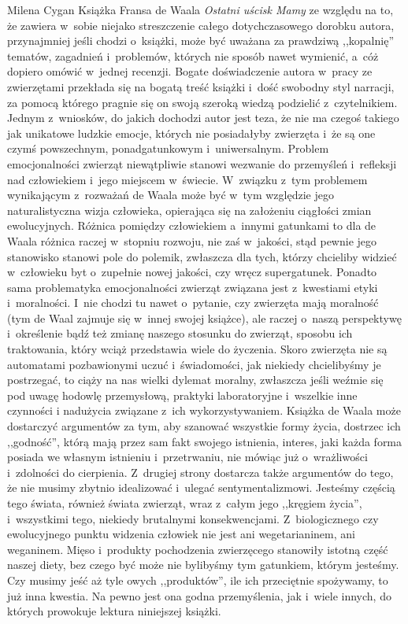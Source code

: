 \begin{newrevplenv}{Milena Cygan}
Książka Fransa de Waala \textit{Ostatni uścisk Mamy} ze względu na to, że zawiera w~sobie niejako streszczenie całego dotychczasowego dorobku autora, przynajmniej jeśli chodzi o~książki, może być uważana za prawdziwą ,,kopalnię'' tematów, zagadnień i~problemów, których nie sposób nawet wymienić, a~cóż dopiero omówić w~jednej recenzji. Bogate doświadczenie autora w~pracy ze zwierzętami przekłada się na bogatą treść książki i~dość swobodny styl narracji, za pomocą którego pragnie się on swoją szeroką wiedzą podzielić z~czytelnikiem. Jednym z~wniosków, do jakich dochodzi autor jest teza, że nie ma czegoś takiego jak unikatowe ludzkie emocje, których nie posiadałyby zwierzęta i~że są one czymś powszechnym, ponadgatunkowym i~uniwersalnym. Problem emocjonalności zwierząt niewątpliwie stanowi wezwanie do przemyśleń i~refleksji nad człowiekiem i~jego miejscem w~świecie. W~związku z~tym problemem wynikającym z~rozważań de Waala może być w~tym względzie jego naturalistyczna wizja człowieka, opierająca się na założeniu ciągłości zmian ewolucyjnych. Różnica pomiędzy człowiekiem a~innymi gatunkami to dla de Waala różnica raczej w~stopniu rozwoju, nie zaś w~jakości, stąd pewnie jego stanowisko stanowi pole do polemik, zwłaszcza dla tych, którzy chcieliby widzieć w~człowieku byt o~zupełnie nowej jakości, czy wręcz supergatunek. Ponadto sama problematyka emocjonalności zwierząt związana jest z~kwestiami etyki i~moralności. I~nie chodzi tu nawet o~pytanie, czy zwierzęta mają moralność (tym de Waal zajmuje się w~innej swojej książce), ale raczej o~naszą perspektywę i~określenie bądź też zmianę naszego stosunku do zwierząt, sposobu ich traktowania, który wciąż przedstawia wiele do życzenia. Skoro zwierzęta nie są automatami pozbawionymi uczuć i~świadomości, jak niekiedy chcielibyśmy je postrzegać, to ciąży na nas wielki dylemat moralny, zwłaszcza jeśli weźmie się pod uwagę hodowlę przemysłową, praktyki laboratoryjne i~wszelkie inne czynności i nadużycia związane z~ich wykorzystywaniem. Książka de Waala może dostarczyć argumentów za tym, aby szanować wszystkie formy życia, dostrzec ich ,,godność'', którą mają przez sam fakt swojego istnienia, interes, jaki każda forma posiada we własnym istnieniu i~przetrwaniu, nie mówiąc już o~wrażliwości i~zdolności do cierpienia. Z~drugiej strony dostarcza także argumentów do tego, że nie musimy zbytnio idealizować i~ulegać sentymentalizmowi. Jesteśmy częścią tego świata, również świata zwierząt, wraz z~całym jego ,,kręgiem życia'', i~wszystkimi tego, niekiedy brutalnymi konsekwencjami. Z~biologicznego czy ewolucyjnego punktu widzenia człowiek nie jest ani wegetarianinem, ani weganinem. Mięso i~produkty pochodzenia zwierzęcego stanowiły istotną część naszej diety, bez czego być może nie bylibyśmy tym gatunkiem, którym jesteśmy. Czy musimy jeść aż tyle owych ,,produktów'', ile ich przeciętnie spożywamy, to już inna kwestia. Na pewno jest ona godna przemyślenia, jak i~wiele innych, do których prowokuje lektura niniejszej książki.


\end{newrevplenv}
